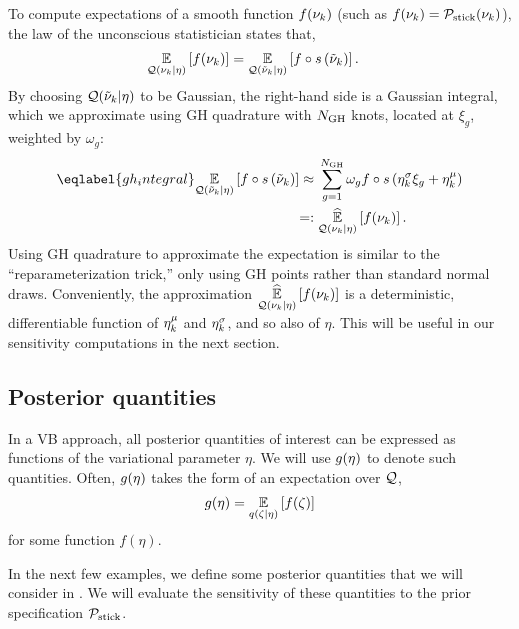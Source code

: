 To compute expectations of a smooth function
$f(\nu_{k})$ (such as $f(\nu_{k}) = \mathcal{P}_{\mathrm{stick}}(\nu_{k})$),
the law of the unconscious statistician states that,
\begin{align*}
  \underset{\mathcal{Q}(\nu_{k} \vert \eta)}{\mathbb{E}}\left[f(\nu_{k})\right] ={}&
  \underset{\mathcal{Q}(\tilde{\nu}_k \vert \eta)}{\mathbb{E}}\left[f\circ s\left(\tilde{\nu}_k\right)\right].
\end{align*}
By choosing $\mathcal{Q}(\tilde{\nu}_k \vert \eta)$ to be Gaussian,
the right-hand side is a Gaussian integral,
which we approximate
using GH quadrature with $N_{\mathrm{GH}}$ knots,
located at $\xi_g$, weighted by $\omega_g$:
%
\begin{align}\eqlabel{gh_integral}
%
\expect{\q(\lnu_\k \vert \eta)}
       {f\circ \s\left(\lnu_\k\right)}
\approx{}&
    \sum_{g=1}^{\ngh} \omega_g f\circ \s \left(\lnusd_\k \xi_{g} + \lnumean_\k\right)
 \nonumber\\=:{}&
\expecthat{\q(\nuk \vert \eta)}{f(\nuk)}.
%
\end{align}
%
Using GH quadrature to approximate the expectation
is similar to the ``reparameterization trick,'' only using
GH points rather than standard normal draws.
Conveniently, the approximation $\underset{\mathcal{Q}(\nu_{k} \vert \eta)}{\widehat{\mathbb{E}}}\left[f(\nu_{k})\right]$
is a deterministic, differentiable
function of $\eta^{\mu}_k$ and $\eta^{\sigma}_k$, and so also of $\eta$.
This will be useful in our sensitivity computations in the next section.

\hrulefill

\subsection{Posterior quantities}

In a VB approach, all posterior quantities of interest can be expressed as
functions of the variational parameter $\eta$. We will use $g(\eta)$ to denote
such quantities. Often, $g(\eta)$ takes the form of an expectation over $\mathcal{Q}$,
\begin{align*}
  g(\eta) = \underset{q(\zeta\vert\eta)}{\mathbb{E}}\left[f(\zeta)\right]
\end{align*}
for some function $f(\eta)$.

In the next few examples, we define some posterior quantities that we will
consider in . We will evaluate the sensitivity
of these quantities to the prior specification $\mathcal{P}_{\mathrm{stick}}$.

